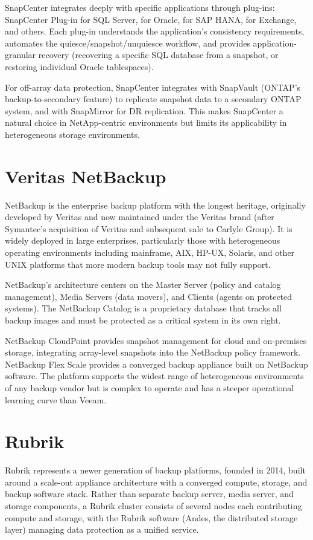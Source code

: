 SnapCenter integrates deeply with specific applications through plug-ins: SnapCenter Plug-in for SQL Server, for Oracle, for SAP HANA, for Exchange, and others. Each plug-in understands the application's consistency requirements, automates the quiesce/snapshot/unquiesce workflow, and provides application-granular recovery (recovering a specific SQL database from a snapshot, or restoring individual Oracle tablespaces).

For off-array data protection, SnapCenter integrates with SnapVault (ONTAP's backup-to-secondary feature) to replicate snapshot data to a secondary ONTAP system, and with SnapMirror for DR replication. This makes SnapCenter a natural choice in NetApp-centric environments but limits its applicability in heterogeneous storage environments.

\section{Veritas NetBackup}
NetBackup is the enterprise backup platform with the longest heritage, originally developed by Veritas and now maintained under the Veritas brand (after Symantec's acquisition of Veritas and subsequent sale to Carlyle Group). It is widely deployed in large enterprises, particularly those with heterogeneous operating environments including mainframe, AIX, HP-UX, Solaris, and other UNIX platforms that more modern backup tools may not fully support.

NetBackup's architecture centers on the Master Server (policy and catalog management), Media Servers (data movers), and Clients (agents on protected systems). The NetBackup Catalog is a proprietary database that tracks all backup images and must be protected as a critical system in its own right.

NetBackup CloudPoint provides snapshot management for cloud and on-premises storage, integrating array-level snapshots into the NetBackup policy framework. NetBackup Flex Scale provides a converged backup appliance built on NetBackup software. The platform supports the widest range of heterogeneous environments of any backup vendor but is complex to operate and has a steeper operational learning curve than Veeam.

\section{Rubrik}
Rubrik represents a newer generation of backup platforms, founded in 2014, built around a scale-out appliance architecture with a converged compute, storage, and backup software stack. Rather than separate backup server, media server, and storage components, a Rubrik cluster consists of several nodes each contributing compute and storage, with the Rubrik software (Andes, the distributed storage layer) managing data protection as a unified service.

